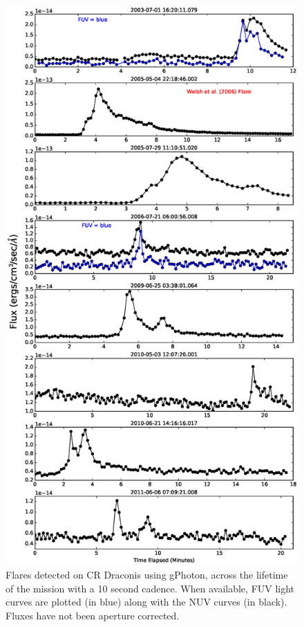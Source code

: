 \documentclass[preprint]{aastex}
\begin{document}
\begin{figure}
\includegraphics[scale=0.375]{Fig14.eps}
\caption{Flares detected on CR Draconis using gPhoton, across the lifetime of the mission with a 10 second cadence. When available, FUV light curves are plotted (in blue) along with the NUV curves (in black). Fluxes have not been aperture corrected. \label{crdraflares}}
\end{figure}
\end{document}
